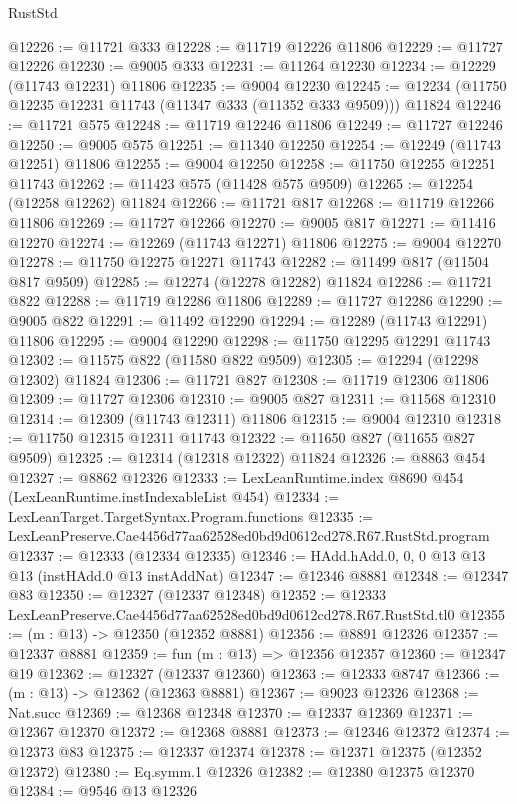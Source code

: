 \begin{lexlean}{RustStd}
\begin{coremodule}
@12226 := @11721 @333
@12228 := @11719 @12226 @11806
@12229 := @11727 @12226
@12230 := @9005 @333
@12231 := @11264 @12230
@12234 := @12229 (@11743 @12231) @11806
@12235 := @9004 @12230
@12245 := @12234 (@11750 @12235 @12231 @11743 (@11347 @333 (@11352 @333 @9509))) @11824
@12246 := @11721 @575
@12248 := @11719 @12246 @11806
@12249 := @11727 @12246
@12250 := @9005 @575
@12251 := @11340 @12250
@12254 := @12249 (@11743 @12251) @11806
@12255 := @9004 @12250
@12258 := @11750 @12255 @12251 @11743
@12262 := @11423 @575 (@11428 @575 @9509)
@12265 := @12254 (@12258 @12262) @11824
@12266 := @11721 @817
@12268 := @11719 @12266 @11806
@12269 := @11727 @12266
@12270 := @9005 @817
@12271 := @11416 @12270
@12274 := @12269 (@11743 @12271) @11806
@12275 := @9004 @12270
@12278 := @11750 @12275 @12271 @11743
@12282 := @11499 @817 (@11504 @817 @9509)
@12285 := @12274 (@12278 @12282) @11824
@12286 := @11721 @822
@12288 := @11719 @12286 @11806
@12289 := @11727 @12286
@12290 := @9005 @822
@12291 := @11492 @12290
@12294 := @12289 (@11743 @12291) @11806
@12295 := @9004 @12290
@12298 := @11750 @12295 @12291 @11743
@12302 := @11575 @822 (@11580 @822 @9509)
@12305 := @12294 (@12298 @12302) @11824
@12306 := @11721 @827
@12308 := @11719 @12306 @11806
@12309 := @11727 @12306
@12310 := @9005 @827
@12311 := @11568 @12310
@12314 := @12309 (@11743 @12311) @11806
@12315 := @9004 @12310
@12318 := @11750 @12315 @12311 @11743
@12322 := @11650 @827 (@11655 @827 @9509)
@12325 := @12314 (@12318 @12322) @11824
@12326 := @8863 @454
@12327 := @8862 @12326
@12333 := LexLeanRuntime.index @8690 @454 (LexLeanRuntime.instIndexableList @454)
@12334 := LexLeanTarget.TargetSyntax.Program.functions
@12335 := LexLeanPreserve.Cae4456d77aa62528ed0bd9d0612cd278.R67.RustStd.program
@12337 := @12333 (@12334 @12335)
@12346 := HAdd.hAdd.{0, 0, 0} @13 @13 @13 (instHAdd.{0} @13 instAddNat)
@12347 := @12346 @8881
@12348 := @12347 @83
@12350 := @12327 (@12337 @12348)
@12352 := @12333 LexLeanPreserve.Cae4456d77aa62528ed0bd9d0612cd278.R67.RustStd.tl0
@12355 := (m : @13) -> @12350 (@12352 @8881)
@12356 := @8891 @12326
@12357 := @12337 @8881
@12359 := fun (m : @13) => @12356 @12357
@12360 := @12347 @19
@12362 := @12327 (@12337 @12360)
@12363 := @12333 @8747
@12366 := (m : @13) -> @12362 (@12363 @8881)
@12367 := @9023 @12326
@12368 := Nat.succ
@12369 := @12368 @12348
@12370 := @12337 @12369
@12371 := @12367 @12370
@12372 := @12368 @8881
@12373 := @12346 @12372
@12374 := @12373 @83
@12375 := @12337 @12374
@12378 := @12371 @12375 (@12352 @12372)
@12380 := Eq.symm.{1} @12326
@12382 := @12380 @12375 @12370
@12384 := @9546 @13 @12326

\end{coremodule}
\end{lexlean}
